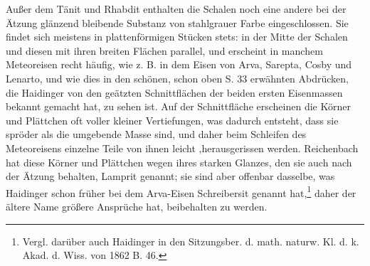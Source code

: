 \documentclass[a4paper, 11pt, oneside]{article}
\begin{document}
Außer dem Tänit und Rhabdit enthalten die Schalen noch eine andere bei der Ätzung glänzend bleibende Substanz von stahlgrauer Farbe eingeschlossen. Sie findet sich meistens in plattenförmigen Stücken stets: in der Mitte der Schalen und diesen mit ihren breiten Flächen parallel, und erscheint in manchem Meteoreisen recht häufig, wie z. B. in dem Eisen von Arva, Sarepta, Cosby und Lenarto, und wie dies in den schönen, schon oben S. 33 erwähnten Abdrücken, die Haidinger von den geätzten Schnittflächen der beiden ersten Eisenmassen bekannt gemacht hat, zu sehen ist. Auf der Schnittfläche erscheinen die Körner und Plättchen oft voller kleiner Vertiefungen, was dadurch entsteht, dass sie spröder als die umgebende Masse sind, und daher beim Schleifen des Meteoreisens einzelne Teile von ihnen leicht ‚herausgerissen werden. Reichenbach hat diese Körner und Plättchen wegen ihres starken Glanzes, den sie auch nach der Ätzung behalten, Lamprit genannt; sie sind aber offenbar dasselbe, was Haidinger schon früher bei dem Arva-Eisen Schreibersit genannt hat,\footnote{Vergl. darüber auch Haidinger in den Sitzungsber. d. math. naturw. Kl. d. k. Akad. d. Wiss. von 1862 B. 46.} daher der ältere Name größere Ansprüche hat, beibehalten zu werden.
\end{document}

